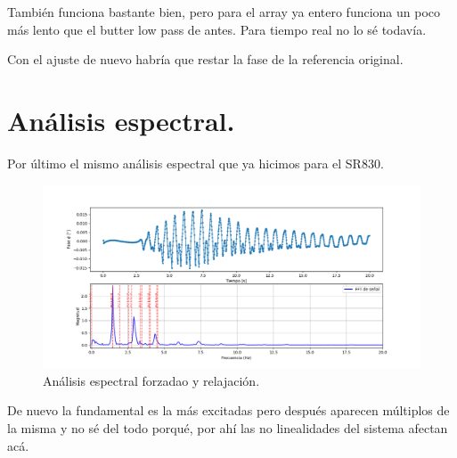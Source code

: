 También funciona bastante bien, pero para el array ya entero funciona un poco más lento que el butter low pass de antes. Para tiempo real no lo sé todavía.  

Con el ajuste de nuevo habría que restar la fase de la referencia original. 


\section*{Análisis espectral.} %
Por último el mismo análisis espectral que ya hicimos para el SR830.

\begin{figure}[th!]
	\centering
	\includegraphics[width=0.987\linewidth]{"Figures/09_06_2025/Análisis espectral señal frozado"}
	\caption{Análisis espectral forzadao y relajación.}
	\label{fig:analisis-espectral-senal-frozado}
\end{figure}

De nuevo la fundamental es la más excitadas pero después aparecen múltiplos de la misma y no sé del todo porqué, por ahí las no linealidades del sistema afectan acá.
